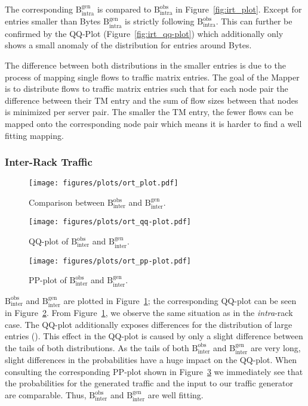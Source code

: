 \documentclass[journal,10pt]{IEEEtran}
\newcommand{\bytes}[2]{\ensuremath{\mathrm{B}^{\mathrm{#1}}_{\mathrm{#2}}}}
\begin{document}
		The corresponding \bytes{gen}{intra}
		is compared to \bytes{obs}{intra} in Figure~\ref{fig:irt_plot}.
		Except for entries smaller than  Bytes \bytes{gen}{intra} is strictly following \bytes{obs}{intra}.
		This can further be confirmed by the QQ-Plot (Figure~\ref{fig:irt_qq-plot}) which additionally only shows a small anomaly of the distribution
		for entries around  Bytes.
		
		The difference between both distributions in the smaller entries is due to the process of mapping single flows to traffic matrix entries.
		The goal of the Mapper is to distribute flows to traffic matrix entries such that for each node pair the difference between 
		their TM entry and the sum of flow sizes between that nodes is minimized per server pair.
		The smaller the TM entry, the fewer flows can be mapped onto the corresponding node pair which means it is harder to find a well fitting mapping.
		
		
		
		
		
		
		\subsubsection{Inter-Rack Traffic}
		\begin{figure}
			\centering
				\texttt{[image: figures/plots/ort\_plot.pdf]}
				\caption{Comparison between \bytes{obs}{inter} and \bytes{gen}{inter}.}
				\label{fig:ort_plot}
\end{figure}
		
		\begin{figure}
			\centering
				\texttt{[image: figures/plots/ort\_qq-plot.pdf]}
				
				\caption{QQ-plot of \bytes{obs}{inter} and \bytes{gen}{inter}.}
				\label{fig:ort_qq-plot}
\end{figure}
		
		\begin{figure}
			\centering
				\texttt{[image: figures/plots/ort\_pp-plot.pdf]}
				\caption{PP-plot of \bytes{obs}{inter} and \bytes{gen}{inter}.}
				\label{fig:ort_pp-plot}
\end{figure}
		
		\bytes{obs}{inter} and \bytes{gen}{inter} are plotted in Figure~\ref{fig:ort_plot};
		the corresponding QQ-plot can be seen
		in Figure~\ref{fig:ort_qq-plot}.
		From Figure~\ref{fig:ort_plot}, we observe the same situation as in the
		\emph{intra}-rack case. The QQ-plot additionally exposes differences for the distribution of large entries ().
		This effect in the QQ-plot is caused by only a slight difference between the tails of both distributions. As the tails of both
		\bytes{obs}{inter} and \bytes{gen}{inter} are very long, slight differences in the probabilities have a huge impact on the QQ-plot.
		When consulting the corresponding PP-plot shown in Figure~\ref{fig:ort_pp-plot} we immediately see that 
		the probabilities for the generated traffic and the input to our traffic generator are comparable.
		Thus, \bytes{obs}{inter} and \bytes{gen}{inter} are well fitting.
		
\end{document}

